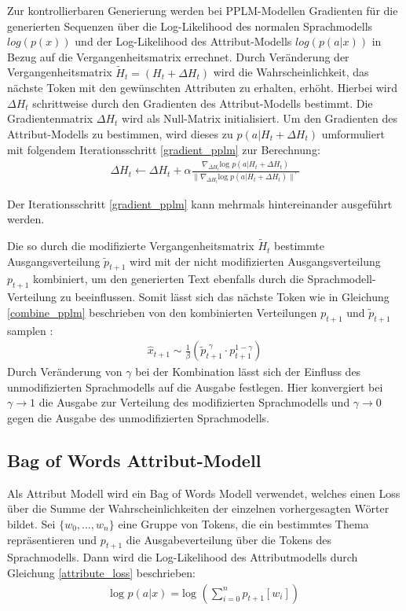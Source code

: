 Zur kontrollierbaren Generierung werden bei PPLM-Modellen Gradienten für die generierten Sequenzen über die Log-Likelihood des normalen Sprachmodells $log(p(x))$ und der Log-Likelihood des Attribut-Modells $log(p(a|x))$ in Bezug auf die Vergangenheitsmatrix errechnet. 
Durch Veränderung der Vergangenheitsmatrix $\tilde{H}_t = (H_t+\Delta H_t)$ wird die Wahrscheinlichkeit, das nächste Token mit den gewünschten Attributen zu erhalten, erhöht. 
Hierbei wird $\Delta H_t$ schrittweise durch den Gradienten des Attribut-Modells bestimmt. 
Die Gradientenmatrix $\Delta H_t$ wird als Null-Matrix initialisiert.
Um den Gradienten des Attribut-Modells zu bestimmen, wird dieses zu $p(a|H_t+\Delta H_t)$ umformuliert mit folgendem Iterationsschritt \ref{gradient_pplm} zur Berechnung:
\begin{align}
    \label{gradient_pplm}
\Delta H_t \leftarrow \Delta H_t + \alpha \frac{\nabla_{\Delta H_t} \text{log }p(a|H_t+\Delta H_t)}{\| \nabla_{\Delta H_t} \text{log }p(a|H_t+\Delta H_t)\|^\gamma}
\end{align}

Der Iterationsschritt \ref{gradient_pplm} kann mehrmals hintereinander ausgeführt werden.

\pagebreak %
Die so durch die modifizierte Vergangenheitsmatrix $\tilde{H}_t$ bestimmte Ausgangsverteilung $\tilde{p}_{t+1}$ wird mit der nicht modifizierten Ausgangsverteilung $p_{t+1}$ kombiniert, um den generierten Text ebenfalls durch die Sprachmodell-Verteilung zu beeinflussen.
Somit lässt sich das nächste Token wie in Gleichung \ref{combine_pplm} beschrieben von den kombinierten Verteilungen $p_{t+1}$ und $\tilde{p}_{t+1}$ samplen \citep{DBLP:journals/corr/abs-1912-02164}: \begin{align} \label{combine_pplm}\hat{x}_{t+1} \sim \frac{1}{\beta} (\tilde{p}_{t+1}^{\text{ }\gamma} \cdot p_{t+1}^{1-\gamma})\end{align}
Durch Veränderung von $\gamma$ bei der Kombination lässt sich der Einfluss des unmodifizierten Sprachmodells auf die Ausgabe festlegen. Hier konvergiert bei $\gamma \rightarrow 1$ die Ausgabe zur Verteilung des modifizierten Sprachmodells und $\gamma \rightarrow 0$ gegen die Ausgabe des unmodifizierten Sprachmodells.




\subsection{Bag of Words Attribut-Modell}
Als Attribut Modell wird ein Bag of Words Modell verwendet, welches einen Loss über die Summe der Wahrscheinlichkeiten der einzelnen vorhergesagten Wörter bildet.
Sei $\{w_0, \ldots, w_n\}$ eine Gruppe von Tokens, die ein bestimmtes Thema repräsentieren und $p_{t+1}$ die Ausgabeverteilung über die Tokens des Sprachmodells.
Dann wird die Log-Likelihood des Attributmodells durch Gleichung \ref{attribute_loss} beschrieben: 
\begin{align}
    \label{attribute_loss}
    \text{log }p(a|x) = \text{log }(\sum_{i=0}^n p_{t+1}[w_i])
\end{align}

